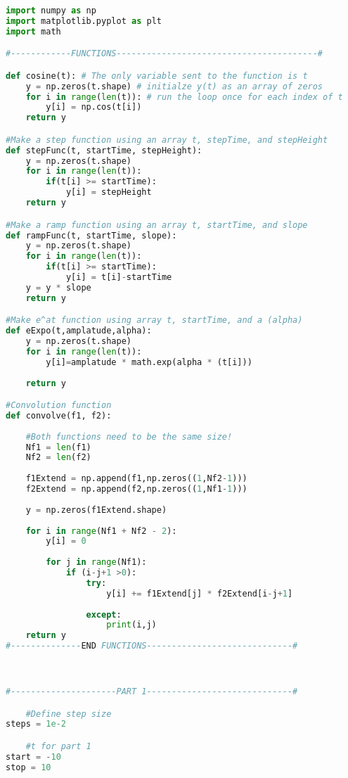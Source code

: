 \documentclass[12pt,a4paper]{article}
\begin{document}
\begin{lstlisting}[language=Python]
import numpy as np
import matplotlib.pyplot as plt
import math

#------------FUNCTIONS----------------------------------------#

def cosine(t): # The only variable sent to the function is t
    y = np.zeros(t.shape) # initialze y(t) as an array of zeros
    for i in range(len(t)): # run the loop once for each index of t
        y[i] = np.cos(t[i])
    return y

#Make a step function using an array t, stepTime, and stepHeight
def stepFunc(t, startTime, stepHeight):
    y = np.zeros(t.shape)
    for i in range(len(t)):
        if(t[i] >= startTime):
            y[i] = stepHeight
    return y

#Make a ramp function using an array t, startTime, and slope
def rampFunc(t, startTime, slope):
    y = np.zeros(t.shape)
    for i in range(len(t)):
        if(t[i] >= startTime):
            y[i] = t[i]-startTime
    y = y * slope
    return y

#Make e^at function using array t, startTime, and a (alpha)
def eExpo(t,amplatude,alpha):
    y = np.zeros(t.shape)
    for i in range(len(t)):
        y[i]=amplatude * math.exp(alpha * (t[i]))
    
    return y

#Convolution function
def convolve(f1, f2):
    
    #Both functions need to be the same size!
    Nf1 = len(f1)
    Nf2 = len(f2)
    
    f1Extend = np.append(f1,np.zeros((1,Nf2-1)))
    f2Extend = np.append(f2,np.zeros((1,Nf1-1)))
    
    y = np.zeros(f1Extend.shape)
    
    for i in range(Nf1 + Nf2 - 2):
        y[i] = 0
        
        for j in range(Nf1):
            if (i-j+1 >0):
                try:
                    y[i] += f1Extend[j] * f2Extend[i-j+1]
                
                except:
                    print(i,j)
    return y
#--------------END FUNCTIONS-----------------------------#



#---------------------PART 1-----------------------------#

    #Define step size
steps = 1e-2

    #t for part 1
start = -10
stop = 10


\end{lstlisting}
\end{document}

